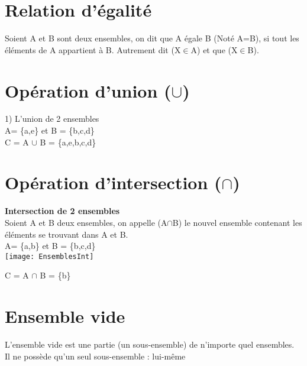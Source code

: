 \newpage
\section{Relation d'égalité}

Soient A et B sont deux ensembles, on dit que A égale B (Noté A=B), si tout les éléments de A appartient à B. Autrement dit (X$\in$A) et que (X$\in$B).

\section{Opération d'union ($\cup$)}
\vspace{3mm} %

1) L'union de 2 ensembles \\

A= \{a,e\} et B = \{b,c,d\} \\

C = A $\cup$ B = \{a,e,b,c,d\}

\vspace{3mm} %
\section{Opération d'intersection ($\cap$)}
\vspace{3mm} %

\textbf{Intersection de 2 ensembles} \\

Soient A et B deux ensembles, on appelle (A$\cap$B) le nouvel ensemble contenant les éléments se trouvant dans A et B. \\

A= \{a,b\} et B = \{b,c,d\} \\

\texttt{[image: EnsemblesInt]}
\vspace{3mm} %

C = A $\cap$ B = \{b\} \\

\section{Ensemble vide}

L'ensemble vide est une partie (un sous-ensemble) de n'importe quel ensembles.\\
Il ne possède qu'un seul sous-ensemble : lui-même \\

